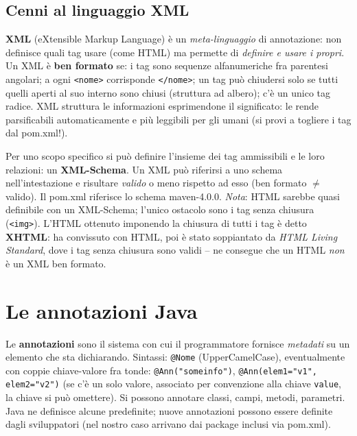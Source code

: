 \subsection{Cenni al linguaggio XML}
\begin{definizione}[XML]
\textbf{XML} (eXtensible Markup Language) \`e un \emph{meta-linguaggio} di annotazione: non
definisce quali tag usare (come HTML) ma permette di \emph{definire e usare i propri}.
Un XML \`e \textbf{ben formato} se: i tag sono sequenze alfanumeriche fra parentesi angolari;
a ogni \texttt{<nome>} corrisponde \texttt{</nome>}; un tag pu\`o chiudersi solo se tutti
quelli aperti al suo interno sono chiusi (struttura ad albero); c'\`e un unico tag radice.
XML struttura le informazioni esprimendone il significato: le rende parsificabili
automaticamente e pi\`u leggibili per gli umani (si provi a togliere i tag dal pom.xml!).
\end{definizione}
Per uno scopo specifico si pu\`o definire l'insieme dei tag ammissibili e le loro relazioni:
un \textbf{XML-Schema}. Un XML pu\`o riferirsi a uno schema nell'intestazione e risultare
\emph{valido} o meno rispetto ad esso (ben formato $\neq$ valido). Il pom.xml riferisce lo
schema maven-4.0.0.
\emph{Nota}: HTML sarebbe quasi definibile con un XML-Schema; l'unico ostacolo sono i tag
senza chiusura (\texttt{<img>}). L'HTML ottenuto imponendo la chiusura di tutti i tag \`e
detto \textbf{XHTML}: ha convissuto con HTML, poi \`e stato soppiantato da \emph{HTML Living
Standard}, dove i tag senza chiusura sono validi -- ne consegue che un HTML \emph{non} \`e un
XML ben formato.

\section{Le annotazioni Java}

\begin{definizione}[Annotazioni]
Le \textbf{annotazioni} sono il sistema con cui il programmatore fornisce \emph{metadati} su
un elemento che sta dichiarando. Sintassi: \texttt{@Nome} (UpperCamelCase), eventualmente con
coppie chiave-valore fra tonde: \texttt{@Ann("someinfo")},
\texttt{@Ann(elem1="v1", elem2="v2")} (se c'\`e un solo valore, associato per convenzione
alla chiave \texttt{value}, la chiave si pu\`o omettere). Si possono annotare classi, campi,
metodi, parametri. Java ne definisce alcune predefinite; nuove annotazioni possono essere
definite dagli sviluppatori (nel nostro caso arrivano dai package inclusi via pom.xml).
\end{definizione}

